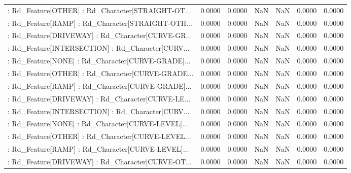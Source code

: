 \begin{longtable}{p{4cm}cccccc}
 : Rd\_Feature[OTHER] : Rd\_Character[STRAIGHT-OT... &            0.0000 &            0.0000 &     NaN &          NaN &             0.0000 &            0.0000 \\
 : Rd\_Feature[RAMP] : Rd\_Character[STRAIGHT-OTH... &            0.0000 &            0.0000 &     NaN &          NaN &             0.0000 &            0.0000 \\
 : Rd\_Feature[DRIVEWAY] : Rd\_Character[CURVE-GR... &            0.0000 &            0.0000 &     NaN &          NaN &             0.0000 &            0.0000 \\
 : Rd\_Feature[INTERSECTION] : Rd\_Character[CURV... &            0.0000 &            0.0000 &     NaN &          NaN &             0.0000 &            0.0000 \\
 : Rd\_Feature[NONE] : Rd\_Character[CURVE-GRADE]... &            0.0000 &            0.0000 &     NaN &          NaN &             0.0000 &            0.0000 \\
 : Rd\_Feature[OTHER] : Rd\_Character[CURVE-GRADE... &            0.0000 &            0.0000 &     NaN &          NaN &             0.0000 &            0.0000 \\
 : Rd\_Feature[RAMP] : Rd\_Character[CURVE-GRADE]... &            0.0000 &            0.0000 &     NaN &          NaN &             0.0000 &            0.0000 \\
 : Rd\_Feature[DRIVEWAY] : Rd\_Character[CURVE-LE... &            0.0000 &            0.0000 &     NaN &          NaN &             0.0000 &            0.0000 \\
 : Rd\_Feature[INTERSECTION] : Rd\_Character[CURV... &            0.0000 &            0.0000 &     NaN &          NaN &             0.0000 &            0.0000 \\
 : Rd\_Feature[NONE] : Rd\_Character[CURVE-LEVEL]... &            0.0000 &            0.0000 &     NaN &          NaN &             0.0000 &            0.0000 \\
 : Rd\_Feature[OTHER] : Rd\_Character[CURVE-LEVEL... &            0.0000 &            0.0000 &     NaN &          NaN &             0.0000 &            0.0000 \\
 : Rd\_Feature[RAMP] : Rd\_Character[CURVE-LEVEL]... &            0.0000 &            0.0000 &     NaN &          NaN &             0.0000 &            0.0000 \\
 : Rd\_Feature[DRIVEWAY] : Rd\_Character[CURVE-OT... &            0.0000 &            0.0000 &     NaN &          NaN &             0.0000 &            0.0000 \\

\end{longtable}

